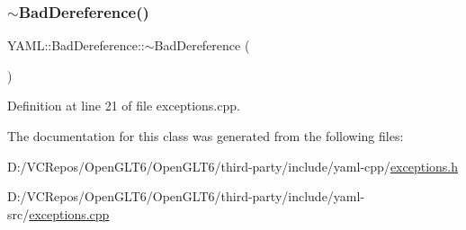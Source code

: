 \subsubsection{\texorpdfstring{$\sim$BadDereference()}{~BadDereference()}}
{\footnotesize\ttfamily Y\+A\+M\+L\+::\+Bad\+Dereference\+::$\sim$\+Bad\+Dereference (\begin{DoxyParamCaption}{ }\end{DoxyParamCaption})\hspace{0.3cm}{\ttfamily [virtual]}}



Definition at line 21 of file exceptions.\+cpp.



The documentation for this class was generated from the following files\+:\begin{DoxyCompactItemize}
\item 
D\+:/\+V\+C\+Repos/\+Open\+G\+L\+T6/\+Open\+G\+L\+T6/third-\/party/include/yaml-\/cpp/\mbox{\hyperlink{exceptions_8h}{exceptions.\+h}}\item 
D\+:/\+V\+C\+Repos/\+Open\+G\+L\+T6/\+Open\+G\+L\+T6/third-\/party/include/yaml-\/src/\mbox{\hyperlink{exceptions_8cpp}{exceptions.\+cpp}}\end{DoxyCompactItemize}
